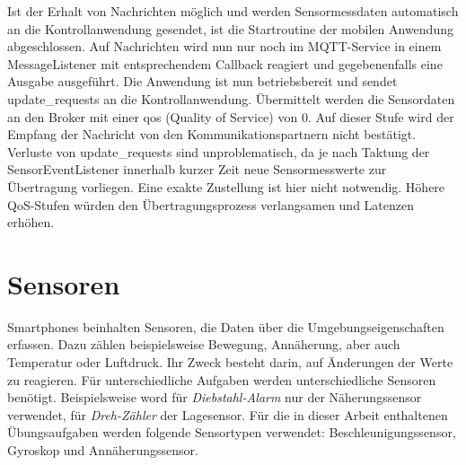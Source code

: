 \documentclass[11pt,a4paper]{report}
\begin{document}
Ist der Erhalt von Nachrichten möglich und werden Sensormessdaten automatisch an die Kontrollanwendung gesendet, ist die Startroutine der mobilen Anwendung abgeschlossen.
Auf Nachrichten wird nun nur noch im MQTT-Service in einem MessageListener mit entsprechendem Callback reagiert und gegebenenfalls eine Ausgabe ausgeführt.
Die Anwendung ist nun betriebsbereit und sendet update\_requests an die Kontrollanwendung.
Übermittelt werden die Sensordaten an den Broker mit einer \acrfull{qos} (Quality of Service) von 0.
Auf dieser Stufe wird der Empfang der Nachricht von den Kommunikationspartnern nicht bestätigt.
Verluste von update\_requests sind unproblematisch, da je nach Taktung der SensorEventListener innerhalb kurzer Zeit neue Sensormesswerte zur Übertragung vorliegen.
Eine exakte Zustellung ist hier nicht notwendig.
Höhere QoS-Stufen würden den Übertragungsprozess verlangsamen und Latenzen erhöhen.

\section{Sensoren}
Smartphones beinhalten Sensoren, die Daten über die Umgebungseigenschaften erfassen.
Dazu zählen beispielsweise Bewegung, Annäherung, aber auch Temperatur oder Luftdruck.
Ihr Zweck besteht darin, auf Änderungen der Werte zu reagieren.
Für unterschiedliche Aufgaben werden unterschiedliche Sensoren benötigt.
Beispielsweise word für \textit{Diebstahl-Alarm} nur der Näherungssensor verwendet, für \textit{Dreh-Zähler} der Lagesensor.
Für die in dieser Arbeit enthaltenen Übungsaufgaben werden folgende Sensortypen verwendet: Beschleunigungssensor, Gyroskop und Annäherungssensor.
\end{document}
